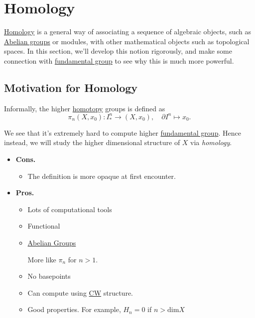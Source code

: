 \chapter{Homology}
\hyperref[def:homology-class]{Homology} is a general way of associating a sequence of algebraic objects, such as \hyperref[def:Abelian-group]{Abelian groups}
or modules, with other  mathematical objects such as topological spaces. In this section, we'll develop this notion rigorously, and make some connection
with \hyperref[def:fundamental-group]{fundamental group} to see why this is much more powerful.


\section{Motivation for Homology}
Informally, the higher \hyperref[def:homotopy]{homotopy} groups is defined as
\[
	\pi _{n} (X, x_0)\colon I^n_\ast \to (X, x_0),\quad \partial I^n \mapsto x_0.
\]

\begin{figure}[H]
	\centering
	\label{fig:higher-homotopy-group-dim2}
\end{figure}


We see that it's extremely hard to compute higher \hyperref[def:fundamental-group]{fundamental group}. Hence instead,
we will study the higher dimensional structure of \(X\) via \emph{homology}.

\begin{itemize}
	\item \textbf{Cons.}
	      \begin{itemize}
		      \item The definition is more opaque at first encounter.
	      \end{itemize}
	\item \textbf{Pros.}
	      \begin{itemize}
		      \item Lots of computational tools
		      \item Functional
		      \item \hyperref[def:Abelian-group]{Abelian Groups}
		            \begin{remark}
			            More like \(\pi _n\) for \(n>1\).
		            \end{remark}
		      \item No basepoints
		      \item Can compute using \hyperref[def:CW-subcomplex]{CW} structure.
		      \item Good properties. For example, \(H_{n} = 0\) if \(n > \mathrm{dim} X\)
	      \end{itemize}
\end{itemize}

